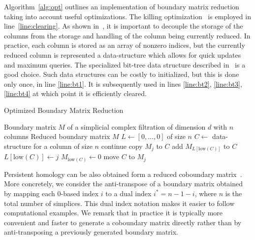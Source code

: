Algorithm~\ref{alg:opt} outlines an implementation of boundary matrix reduction taking into account useful optimizations. The killing optimization~\cite{Chen2011twist} is employed in line~\ref{line:clearing}. As shown in~\cite{phat}, it is important to decouple the storage of the columns from the storage and handling of the column being currently reduced. In practice, each column is stored as an array of nonzero indices, but the currently reduced column is represented a data-structure which allows for quick updates and maximum queries. The specialized bit-tree data structure described in~\cite{phat} is a good choice. Such data structures  can be costly to initialized, but this is done only once, in line \ref{line:bt1}. It is subsequently used in lines \ref{line:bt2}, \ref{line:bt3}, \ref{line:bt4} at which point it is efficiently cleared.

\begin{algorithm}
\caption{Optimized Boundary Matrix Reduction}
\label{alg:opt}
\begin{algorithmic}[1]
\Require Boundary matrix $M$ of a simplicial complex filtration of dimension $d$ with $n$ columns
\Ensure Reduced boundary matrix $M$
\State $L \gets [0, \dots, 0]$ of size $n$
\State $C \gets$ data-structure for a column of size $n$ \label{line:bt1}
            \State continue
        \EndIf        
        \State copy $M_j$ to $C$ \label{line:bt2}
            \State  add $M_{L[\text{low}(C)]}$ to $C$ \label{line:bt3} 
        \EndWhile
            \State $L[\text{low}(C)] \gets j$ 
            \State $M_{\text{low}(C)} \gets 0$ \label{line:clearing}
        \EndIf
        \State move $C$ to $M_{j}$ \label{line:bt4}    
    \EndFor
\EndFor
\end{algorithmic}
\end{algorithm}

Persistent homology can be also obtained form a reduced coboundary matrix~\cite{deSilva_2011}. More concretely, we consider the anti-transpose of a boundary matrix obtained by mapping each $0$-based index $i$ to a dual index $i^* = n-1-i$, where $n$ is the total number of simplices. This dual index notation makes it easier to follow computational examples. We remark that in practice it is typically more convenient and faster to generate a coboundary matrix directly rather than by anti-transposing a previously generated boundary matrix.

